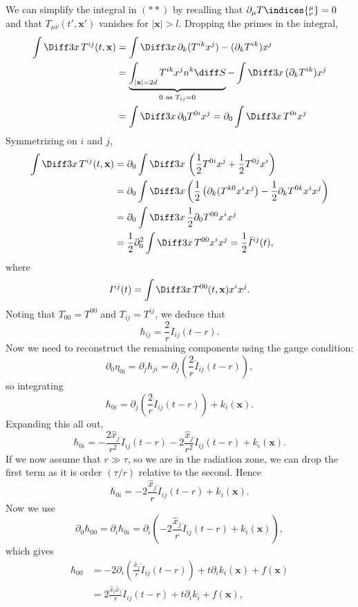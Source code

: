 \documentclass[12pt]{article}
\begin{document}
We can simplify the integral in $(\ast\ast)$ by recalling that $\partial_\mu T\indices{^{\mu}_{\nu}} = 0$ and that $T_{\mu\nu}(t', \mathbf{x}')$ vanishes for $|\mathbf{x}| > l$. Dropping the primes in the integral,
\begin{align*}
	\int \Diff 3 x\, T^{ij}(t, \mathbf{x}) &= \int \Diff 3 x\, \partial_k (T^{ik} x^j) - (\partial_k T^{ik}) x^j \\
					       &= \underbrace{\int_{|\mathbf{x}| = 2d} T^{ik} x^j n^k \diff S}_{0 \text{ as } T_{ij} = 0} - \int \Diff 3 x \, (\partial_k T^{ik})x^j \\
					       &= \int \Diff 3 x \, \partial_0 T^{0i} x^j = \partial_0 \int \Diff 3 x \, T^{0i} x^j
\end{align*}
Symmetrizing on $i$ and $j$,
\begin{align*}
	\int \Diff 3 x \, T^{ij} (t,\mathbf{x}) &= \partial_0  \int \Diff 3 x \, \left( \frac 12 T^{0i} x^j + \frac 12 T^{0j} x^i \right) \\
						&= \partial_0 \int \Diff 3 x \left( \frac 12 \left(\partial_k (T^{k0} x^i x^j \right) - \frac 12 \partial_k T^{0k} x^i x^j \right) \\
						&= \partial_0 \int \Diff 3 x \, \frac 12 \partial_0 T^{00} x^i x^j \\
						&= \frac 12 \partial_0^2 \int \Diff 3 x \, T^{00} x^i x^j = \frac 12 \ddot I^{ij}(t),
\end{align*}
where
\[
I^{ij}(t) = \int \Diff 3 x \, T^{00}(t, \mathbf{x}) x^i x^j.
\]
Noting that $T_{00} = T^{00}$ and $T_{ij} = T^{ij}$, we deduce that
\[
\hbar_{ij} = \frac 2r \ddot I_{ij}(t - r).
\]
Now we need to reconstruct the remaining components using the gauge condition:
\[
\partial_0 \eta_{0i} = \partial_j \hbar_{ji} = \partial_j \left( \frac{2}{r} \ddot I_{ij}(t - r) \right),
\]
so integrating
\[
\hbar_{0i} = \partial_j \left( \frac 2r \dot I_{ij}(t - r) \right) + k_i(\mathbf{x}).
\]
Expanding this all out,
\[
\hbar_{0i} = - \frac{2 \hat x_j}{r^2} \dot I_{ij} (t - r) - 2 \frac{\hat x_j}{r^2} \ddot I_{ij} (t - r) + k_i(\mathbf{x}).
\]
If we now assume that $r \gg \tau$, so we are in the radiation zone, we can drop the first term as it is order $(\tau/r)$ relative to the second. Hence
\[
\hbar_{0i} = - 2 \frac{\hat x_j}{r} \ddot I_{ij}(t - r) + k_i(\mathbf{x}).
\]
Now we use
\[
\partial_0 \hbar_{00} = \partial_i \hbar_{0i} = \partial_i \left( - 2 \frac{\hat x_j}{r} \ddot I_{ij}(t - r) + k_i(\mathbf{x}) \right),
\]
which gives
\begin{align*}
	\hbar_{00} &= - 2 \partial_i \left( \frac{\hat x_j}{r} \dot I_{ij} (t - r) \right) + t \partial_i k_i(\mathbf{x}) + f(\mathbf{x}) \\
		   &= 2 \frac{\hat x_i \hat x_j}{r} \ddot I_{ij}(t - r) + t \partial_i k_i + f(\mathbf{x}),
\end{align*}
\end{document}
